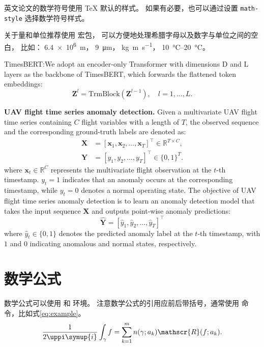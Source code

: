 英文论文的数学符号使用 \TeX{} 默认的样式。
如果有必要，也可以通过设置 \verb|math-style| 选择数学符号样式。

关于量和单位推荐使用
\href{http://mirrors.ctan.org/macros/latex/contrib/siunitx/siunitx.pdf}{}
宏包，
可以方便地处理希腊字母以及数字与单位之间的空白，
比如：
\SI{6.4e6}{m}，
\SI{9}{\micro\meter}，
\si{kg.m.s^{-1}}，
\SIrange{10}{20}{\degreeCelsius}。


TimesBERT:We adopt an encoder-only Transformer with dimensions D and L layers as the backbone of TimesBERT, which forwards the flattened token embeddings:
\begin{equation}
\mathbf{Z}^l = \mathrm{TrmBlock}(\mathbf{Z}^{l-1}), \quad l = 1, \dots, L.
\end{equation}


\textbf{UAV flight time series anomaly detection.} Given a multivariate UAV flight time series containing \(C\) flight variables with a length of \(T\), the observed sequence and the corresponding ground-truth labels are denoted as:
\begin{equation}
\begin{aligned}
\mathbf{X} &= [\mathbf{x}_1, \mathbf{x}_2, \dots, \mathbf{x}_T]^\top \in \mathbb{R}^{T \times C}, \\
\mathbf{Y} &= [y_1, y_2, \dots, y_T]^\top \in \{0, 1\}^T.
\end{aligned}
\end{equation}
where \(\mathbf{x}_t \in \mathbb{R}^C\) represents the multivariate flight observation at the \(t\)-th timestamp. \(y_t = 1\) indicates that an anomaly occurs at the corresponding timestamp, while \(y_t = 0\) denotes a normal operating state. The objective of UAV flight time series anomaly detection is to learn an anomaly detection model that takes the input sequence \(\mathbf{X}\) and outputs point-wise anomaly predictions:
\begin{equation}
\hat{\mathbf{Y}} = [\hat{y}_1, \hat{y}_2, \dots, \hat{y}_T]^\top
\end{equation}
where \(\hat{y}_t \in \{0, 1\}\) denotes the predicted anomaly label at the \(t\)-th timestamp, with \(1\) and \(0\) indicating anomalous and normal states, respectively.



\section{数学公式}

数学公式可以使用  和  环境。
注意数学公式的引用应前后带括号，通常使用  命令，比如式\eqref{eq:example}。
\begin{equation}
  \frac{1}{2 \uppi \symup{i}} \int_\gamma f = \sum_{k=1}^m n(\gamma; a_k) \mathscr{R}(f; a_k).
  \label{eq:example}
\end{equation}

